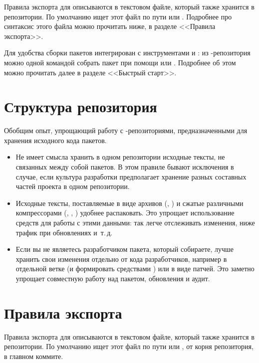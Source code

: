 Правила экспорта для  описываются в текстовом файле, который также хранится в 
репозитории. По умолчанию  ищет этот файл по пути  или . 
Подробнее про синтаксис этого файла можно прочитать ниже, в разделе <<Правила экспорта>>.

Для удобства сборки пакетов  интегрирован с инструментами  и 
: из -репозитория можно одной командой собрать пакет при помощи 
 или . Подробнее об этом можно прочитать далее в разделе <<Быстрый старт>>. 


\section{Структура репозитория}
Обобщим опыт, упрощающий работу с -репозиториями, предназначенными для хранения исходного кода пакетов. 

\begin{itemize}
	\item {}
	
	Не имеет смысла хранить в одном репозитории исходные тексты, не связанных между собой пакетов. 
		В этом правиле бывают исключения в случае, если культура разработки предполагает хранение 
		разных составных частей проекта в одном репозитории.
	\item  {}
	
	Исходные тексты, поставляемые в виде архивов (, ) и сжатые различными 
		компрессорами (, , ) удобнее распаковать. Это упрощает 
		использование средств  для работы с этими данными: так легче отслеживать изменения, 
		ниже трафик при обновлениях и~т.\,д.
	\item {}
	
	Если вы не являетесь разработчиком пакета, который собираете, лучше хранить свои изменения отдельно 
		от кода разработчиков, например в отдельной ветке (и формировать  средствами ) 
		или в виде патчей. Это заметно упрощает совместную работу над пакетом, обновления и аудит.
\end{itemize}


\section{Правила экспорта}
Правила экспорта для  описываются в текстовом файле, который также хранится в репозитории. 
По умолчанию  ищет этот файл по пути  или , от корня репозитория, 
в главном коммите. 

